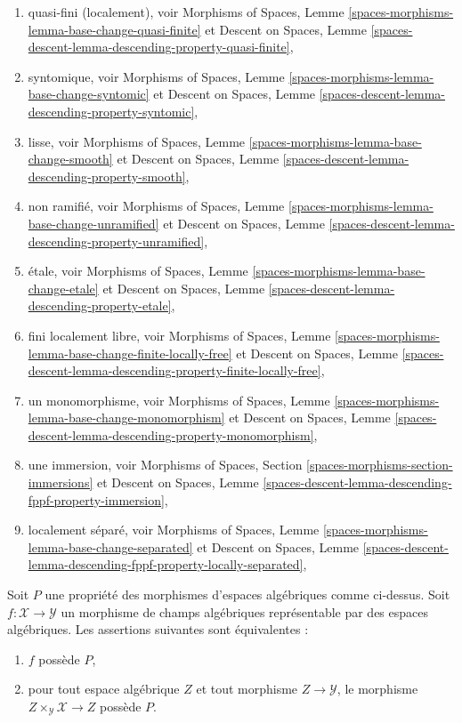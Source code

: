 \begin{enumerate}
Morphisms of Spaces,
Lemme \ref{spaces-morphisms-lemma-base-change-integral}
et
Descent on Spaces,
Lemme \ref{spaces-descent-lemma-descending-property-finite},
\item quasi-fini (localement), voir
Morphisms of Spaces,
Lemme \ref{spaces-morphisms-lemma-base-change-quasi-finite}
et
Descent on Spaces,
Lemme \ref{spaces-descent-lemma-descending-property-quasi-finite},
\item syntomique, voir
Morphisms of Spaces,
Lemme \ref{spaces-morphisms-lemma-base-change-syntomic}
et
Descent on Spaces,
Lemme \ref{spaces-descent-lemma-descending-property-syntomic},
\item lisse, voir
Morphisms of Spaces,
Lemme \ref{spaces-morphisms-lemma-base-change-smooth}
et
Descent on Spaces,
Lemme \ref{spaces-descent-lemma-descending-property-smooth},
\item non ramifié, voir
Morphisms of Spaces,
Lemme \ref{spaces-morphisms-lemma-base-change-unramified}
et
Descent on Spaces,
Lemme \ref{spaces-descent-lemma-descending-property-unramified},
\item \'etale, voir
Morphisms of Spaces,
Lemme \ref{spaces-morphisms-lemma-base-change-etale}
et
Descent on Spaces,
Lemme \ref{spaces-descent-lemma-descending-property-etale},
\item fini localement libre, voir
Morphisms of Spaces,
Lemme \ref{spaces-morphisms-lemma-base-change-finite-locally-free}
et
Descent on Spaces,
Lemme \ref{spaces-descent-lemma-descending-property-finite-locally-free},
\item un monomorphisme, voir
Morphisms of Spaces,
Lemme \ref{spaces-morphisms-lemma-base-change-monomorphism}
et
Descent on Spaces,
Lemme \ref{spaces-descent-lemma-descending-property-monomorphism},
\item une immersion, voir
Morphisms of Spaces, Section \ref{spaces-morphisms-section-immersions}
et
Descent on Spaces,
Lemme \ref{spaces-descent-lemma-descending-fppf-property-immersion},
\item localement séparé, voir
Morphisms of Spaces,
Lemme \ref{spaces-morphisms-lemma-base-change-separated}
et
Descent on Spaces,
Lemme \ref{spaces-descent-lemma-descending-fppf-property-locally-separated},
\end{enumerate}

\begin{lemma}
\label{lemma-property-spaces-too}
Soit $P$ une propriété des morphismes d'espaces algébriques comme ci-dessus.
Soit $f : \mathcal{X} \to \mathcal{Y}$ un morphisme de champs algébriques
représentable par des espaces algébriques. Les assertions suivantes sont équivalentes :
\begin{enumerate}
\item $f$ possède $P$,
\item pour tout espace algébrique $Z$ et tout morphisme $Z \to \mathcal{Y}$,
le morphisme $Z \times_\mathcal{Y} \mathcal{X} \to Z$ possède $P$.
\end{enumerate}
\end{lemma}

